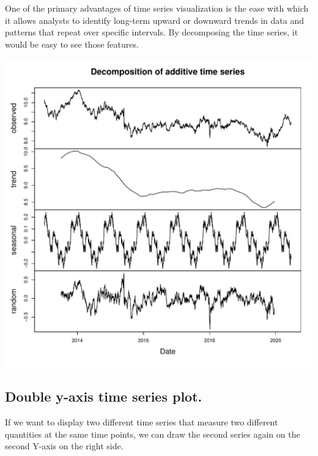 \documentclass{article}\usepackage[]{graphicx}\usepackage[]{xcolor}
\makeatletter
\def\maxwidth{ %
  \ifdim\Gin@nat@width>\linewidth
    \linewidth
  \else
    \Gin@nat@width
  \fi
}
\newenvironment{knitrout}{}{} %
\makeatother
\begin{document}
One of the primary advantages of time series visualization is the ease with which it allows analysts to identify long-term upward or downward trends in data and patterns that repeat over specific intervals. By decomposing the time series, it would be easy to see those features.

\begin{knitrout}
\color{fgcolor}
\includegraphics[width=\maxwidth]{figure/unnamed-chunk-2-1} 
\end{knitrout}


\subsection{Double y-axis time series plot.}

If we want to display two different time series that measure two different quantities at the same time points, we can draw the second series again on the second Y-axis on the right side.
\end{document}
